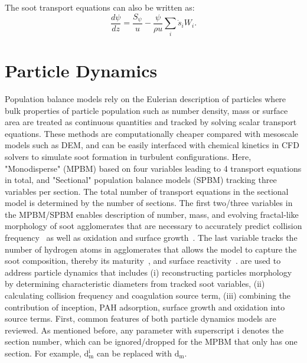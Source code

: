 The soot transport equations can also be written as:
\begin{equation}
	\frac{d \psi}{d z}=
	\frac{S_{\psi}}{u}
	-\frac{\psi}{\rho u}\sum_i \dot{s}_i W_i
	\label{eqn:sootpfr}.
\end{equation}


\section{Particle Dynamics}
Population balance models rely on the Eulerian description of particles where bulk properties of particle population such as number density, mass or surface area are treated as continuous quantities and tracked by solving scalar transport equations. These methods are computationally cheaper compared with mesoscale models such as DEM, and can be easily interfaced with chemical kinetics in CFD solvers to simulate soot formation in turbulent configurations. Here, "Monodisperse" (MPBM) based on four variables leading to 4 transport equations in total, and "Sectional" population balance models (SPBM) tracking three variables per section. The total number of transport equations in the sectional model is determined by the number of sections. The first two/three variables in the MPBM/SPBM enables description of number, mass, and evolving fractal-like morphology of soot agglomerates that are necessary to accurately predict collision frequency~\citep{mulholland1988cluster} as well as oxidation and surface growth~\citep{kelesidis2019estimating}. The last variable tracks the number of hydrogen atoms in agglomerates that allows the model to capture the soot composition, thereby its maturity~\citep{kholghy2016core}, and surface reactivity~\citep{blanquart2009analyzing}.  are used to address particle dynamics that includes (i) reconstructing particles morphology by determining characteristic diameters from tracked soot variables, (ii) calculating collision frequency and coagulation source term, (iii) combining the contribution of inception, PAH adsorption, surface growth and oxidation into source terms.
First, common features of both particle dynamics models are reviewed. As mentioned before, any parameter with superscript i denotes the section number, which can be ignored/dropped for the MPBM that only has one section. For example, $\mathrm{d^i_m}$ can be replaced with $\mathrm{d_m}$.


